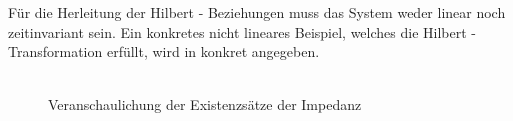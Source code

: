 Für die Herleitung der Hilbert - Beziehungen muss das System weder linear noch zeitinvariant sein. Ein konkretes nicht lineares Beispiel, welches die Hilbert - Transformation erfüllt, wird in \cite{Dotz2013a} konkret angegeben. \\\\

\begin{figure}[ht]
	\centering
	\def\svgwidth{0.9\columnwidth}
	
	\caption{Veranschaulichung der Existenzsätze der Impedanz}
	\label{fig:impedanz}
\end{figure}
%
%
%
% 
 

                                                                                                                                                                                                                                                                                                                                                                                                                                              
                                                                                                                                                       
                                                                                                                                                                                                                                                                                                         
                                                                                                                                                
                                                                                                                                                      
                                                                                                                                         
                                                                                                                                            
